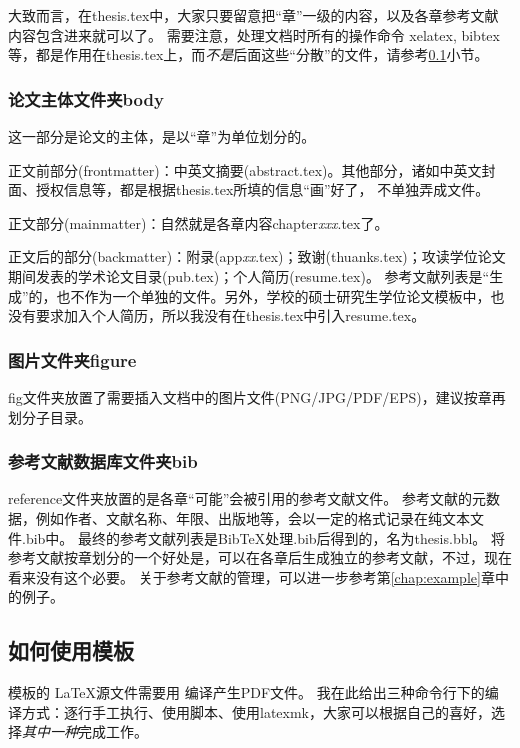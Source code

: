 大致而言，在thesis.tex中，大家只要留意把``章''一级的内容，以及各章参考文献内容包含进来就可以了。
需要注意，处理文档时所有的操作命令 \cndash{} xelatex, bibtex等，都是作用在thesis.tex上，而\emph{不是}后面这些``分散''的文件，请参考\ref{sec:process}小节。

\subsubsection{论文主体文件夹body}
\label{sec:thesisbody}

这一部分是论文的主体，是以``章''为单位划分的。

正文前部分(frontmatter)：中英文摘要(abstract.tex)。其他部分，诸如中英文封面、授权信息等，都是根据thesis.tex所填的信息``画''好了，
不单独弄成文件。

正文部分(mainmatter)：自然就是各章内容chapter\emph{xxx}.tex了。

正文后的部分(backmatter)：附录(app\emph{xx}.tex)；致谢(thuanks.tex)；攻读学位论文期间发表的学术论文目录(pub.tex)；个人简历(resume.tex)。
参考文献列表是``生成''的，也不作为一个单独的文件。另外，学校的硕士研究生学位论文模板中，也没有要求加入个人简历，所以我没有在thesis.tex中引入resume.tex。

\subsubsection{图片文件夹figure}
\label{sec:fig}

fig文件夹放置了需要插入文档中的图片文件(PNG/JPG/PDF/EPS)，建议按章再划分子目录。

\subsubsection{参考文献数据库文件夹bib}
\label{sec:bib}

reference文件夹放置的是各章``可能''会被引用的参考文献文件。
参考文献的元数据，例如作者、文献名称、年限、出版地等，会以一定的格式记录在纯文本文件.bib中。
最终的参考文献列表是BibTeX处理.bib后得到的，名为thesis.bbl。
将参考文献按章划分的一个好处是，可以在各章后生成独立的参考文献，不过，现在看来没有这个必要。
关于参考文献的管理，可以进一步参考第\ref{chap:example}章中的例子。

\subsection{如何使用模板}
\label{sec:process}

模板的 \LaTeX 源文件需要用 \XeTeX 编译产生PDF文件。
我在此给出三种命令行下的编译方式：逐行手工执行、使用脚本、使用latexmk，大家可以根据自己的喜好，选择\emph{其中一种}完成工作。

